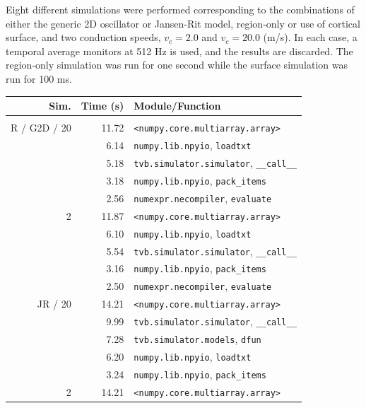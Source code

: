 \documentclass{bioinfo}
\begin{document}
	Eight different simulations were performed corresponding to the combinations of
	either the generic 2D oscillator or Jansen-Rit model, region-only
	or use of cortical surface, and two conduction speeds, $v_c = 2.0$ and
	$v_c = 20.0$ (m/s). In each case, a temporal average monitors at 512 Hz
	is used, and the results are discarded. The region-only simulation was
	run for one second while the surface simulation was run for 100 ms. 


		\begin{table}
		{\footnotesize \begin{tabular}{r | r | l }
		Sim. &        Time (s) &                     Module/Function \\
		\hline \\
		R / G2D / 20  &         11.72 & \texttt{<numpy.core.multiarray.array>} \\
		&          6.14 & \texttt{numpy.lib.npyio}, \texttt{loadtxt} \\
		 &         5.18 & \texttt{tvb.simulator.simulator}, \texttt{\_\_call\_\_} \\
		 &         3.18 & \texttt{numpy.lib.npyio}, \texttt{pack\_items} \\
		 &          2.56 & \texttt{numexpr.necompiler}, \texttt{evaluate} \\
		\hline
		2 &         11.87 & \texttt{<numpy.core.multiarray.array>} \\
		&         6.10 & \texttt{numpy.lib.npyio}, \texttt{loadtxt} \\
		 &         5.54 & \texttt{tvb.simulator.simulator}, \texttt{\_\_call\_\_} \\
		 &         3.16 & \texttt{numpy.lib.npyio}, \texttt{pack\_items} \\
		 &         2.50 & \texttt{numexpr.necompiler}, \texttt{evaluate} \\
		\hline
		 JR / 20  &         14.21 & \texttt{<numpy.core.multiarray.array>} \\
		&         9.99 & \texttt{tvb.simulator.simulator}, \texttt{\_\_call\_\_} \\
		 &         7.28 & \texttt{tvb.simulator.models}, \texttt{dfun} \\
		 &           6.20 & \texttt{numpy.lib.npyio}, \texttt{loadtxt} \\
		 &         3.24 & \texttt{numpy.lib.npyio}, \texttt{pack\_items} \\
		\hline
		2 &         14.21& \texttt{<numpy.core.multiarray.array>} \\

\end{tabular}}
\end{table}
\end{document}
